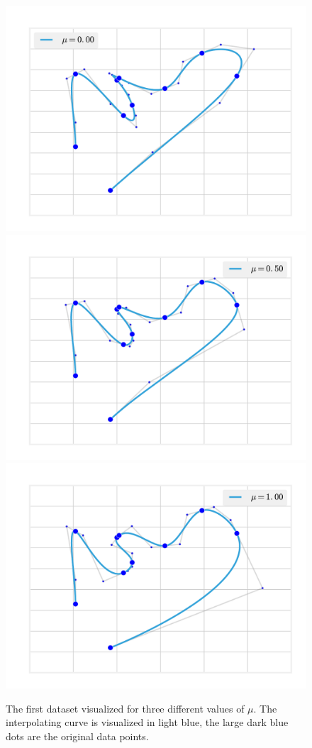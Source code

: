 \documentclass{article}
\begin{document}
\begin{figure}
    \centering
    \label{fig:one}
    \includegraphics[scale=0.4]{pictures/one_0.pdf} 
    \includegraphics[scale=0.4]{pictures/one_1.pdf}
    \includegraphics[scale=0.4]{pictures/one_2.pdf}
    \caption{The first dataset visualized for three different values of
    $\mu$. The interpolating curve is visualized in light blue, the large
    dark blue dots are the original data points.}
\end{figure}
\end{document}
